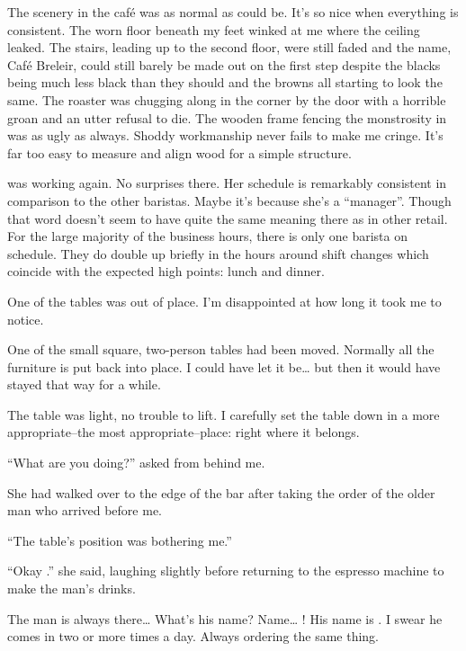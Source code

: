 %
\noindent
The scenery in the caf\'e was as normal as could be.
It's so nice when everything is consistent.
The worn floor beneath my feet winked at me where the ceiling leaked.
The stairs, leading up to the second floor, were still faded and the name,
Caf\'e Breleir, could still barely be made out on the first step despite
the blacks being much less black than they should and the browns all
starting to look the same. The roaster was chugging along
in the corner by the door with a horrible groan and an utter refusal to die.
The wooden frame fencing the monstrosity in was as ugly as always.
Shoddy workmanship never fails to make me cringe.
It's far too easy to measure and align wood for a simple structure.


\april{} was working again.  No surprises there.
Her schedule is remarkably consistent in comparison to the other baristas.
Maybe it's because she's a ``manager''.  Though that word doesn't seem to
have quite the same meaning there as in other retail.
For the large majority of the business hours, there is only one barista
on schedule.  They do double up briefly in the hours around shift changes
which coincide with the expected high points: lunch and dinner.


One of the tables was out of place.
I'm disappointed at how long it took me to notice.


One of the small square, two-person tables had been moved.
Normally all the furniture is put back into place.
I could have let it be\ldots{} but then it would have
stayed that way for a while.


The table was light, no trouble to lift.
I carefully set the table down in a more
appropriate--the most appropriate--place:
right where it belongs.
\VV


``What are you doing?'' \april{} asked from behind me.
\VV


\noindent
She had walked over to the edge of the bar after taking the order
of the older man who arrived before me.
\VV


``The table's position was bothering me.''
\VV


``Okay \josh.'' she said, laughing slightly before returning to
the espresso machine to make the man's drinks.
\VV


\noindent
The man is always there\ldots{} What's his name? Name\ldots{} \dameon!
His name is \dameon. I swear he comes in two or more times a day.
Always ordering the same thing.
\VV


